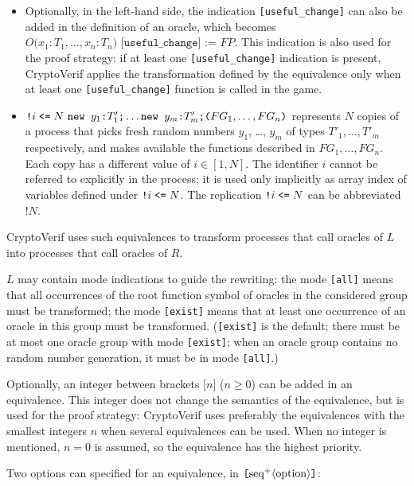 \begin{itemize}
\begin{itemize}
\item Optionally, in the left-hand side, 
the indication \texttt{[useful\_change]} can also
be added in the definition of an oracle, which becomes 
$O\texttt{(}x_1:T_1, \ldots, x_n:T_n\texttt{) [useful\_change] := }\mathit{FP}$.
This indication is also used for the proof strategy: 
if at least one \texttt{[useful\_change]} indication is present,
CryptoVerif applies the transformation defined by the equivalence
only when at least one \texttt{[useful\_change]} function is called in the game.

\item $\texttt{!} i \leqt  N\ \Resa{y_1}{T'_1}\texttt{;}
\ldots \Resa{y_m}{T'_m} \texttt{;} \texttt{(}FG_1, \ldots,
FG_n\texttt{)}$ represents $N$ copies of a process that picks fresh
random numbers $y_1$, \ldots, $y_m$ of types $T'_1, \ldots, T'_m$
respectively, and makes available the functions described in $FG_1,
\ldots, FG_n$. Each copy has a different value of $i \in [1, N]$. The
identifier $i$ cannot be referred to explicitly in the process; it is
used only implicitly as array index of variables defined under
$\texttt{!} i \mathrel{\texttt{<=}}  N$.  The replication $\texttt{!} i
\mathrel{\texttt{<=}}  N$ can be abbreviated $\texttt{!} N$.

\end{itemize}
CryptoVerif uses such equivalences to transform processes that call
oracles of $L$ into processes that call oracles of $R$.

$L$ may contain mode indications to guide the rewriting: the mode
\texttt{[all]} means that all occurrences of the root function symbol
of oracles in the considered group must be transformed;
the mode \texttt{[exist]} means that at least one occurrence of an
oracle in this group must be transformed. (\texttt{[exist]} is the default;
there must be at most one oracle group with mode \texttt{[exist]};
when an oracle group contains no random number generation, it must be in mode 
\texttt{[all]}.)

Optionally, 
an integer between brackets $\texttt{[}n\texttt{]}$ ($n \geq 0$)
can be added in an equivalence.
This integer does not change the semantics of the equivalence, but is
used for the proof strategy: CryptoVerif uses preferably the equivalences
with the smallest integers $n$ when several equivalences can be used.
When no integer is mentioned,
$n = 0$ is assumed, so the equivalence has the highest priority.

Two options can specified for an equivalence, in
$\texttt{[}\textrm{seq}^+\langle\textrm{option}\rangle\texttt{]}$:
\begin{itemize}


\end{itemize}
\end{itemize}
